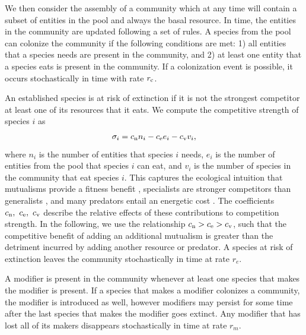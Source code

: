 \documentclass[twocolumn,preprintnumbers,amsmath,amssymb,superscriptaddress,linenumbers]{revtex4-1}
\newcommand{\rr}[1]{{\rm #1}}
\begin{document}
\begin{bibunit}
{  We then consider the assembly of a community which at any time will contain a subset of entities in the pool and always the basal resource.
  In time, the entities in the community are updated following a set of rules.
  A species from the pool can colonize the community if the following conditions are met:
  1) all entities that a species needs are present in the community, and
  2) at least one entity that a species eats is present in the community.
  If a colonization event is possible, it occurs stochastically in time with rate $r_\rr{c}$.

  An established species is at risk of extinction if it is not the strongest competitor at least one of its resources that it eats.
  We compute the competitive strength of species $i$ as
  \begin{equation}
    \sigma_i = c_\rr{n} n_i - c_\rr{e} e_i - c_\rr{v} v_i,
  \end{equation}
  where $n_i$ is the number of entities that species $i$ needs, $e_i$ is the number of entities from the pool that species $i$ can eat, and $v_i$ is the number of species in the community that eat species $i$.
  This captures the ecological intuition that mutualisms provide a fitness benefit \cite{Bronstein1994}, specialists are stronger competitors than generalists \cite{Futuyma1988}, and many predators entail an energetic cost \cite{Brown1994}.
  The coefficients $c_\rr{n},~c_\rr{e},~c_\rr{v}$ describe the relative effects of these contributions to competition strength.
  In the following, we use the relationship $c_\rr{n} > c_\rr{e} > c_\rr{v}$, such that the competitive benefit of adding an additional mutualism is greater than the detriment incurred by adding another resource or predator.
  A species at risk of extinction leaves the community stochastically in time at rate $r_e$.

  A modifier is present in the community whenever at least one species that makes the modifier is present.
  If a species that makes a modifier colonizes a community, the modifier is introduced as well, however modifiers may persist for some time after the last species that makes the modifier goes extinct.
  Any modifier that has lost all of its makers disappears stochastically in time at rate $r_m$.

}
\end{bibunit}
\end{document}
